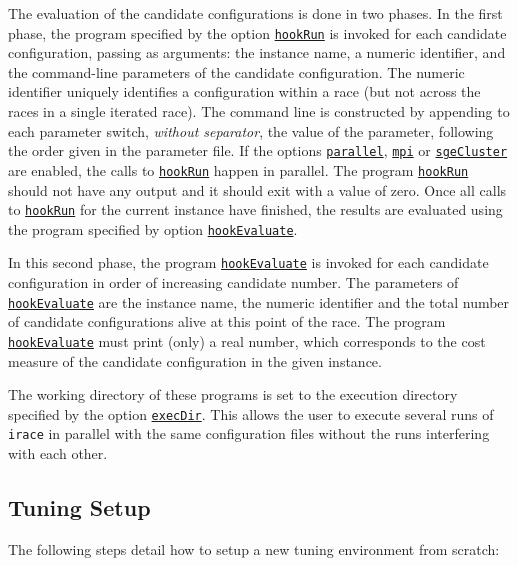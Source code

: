 \documentclass[a4paper]{article}
\newcommand{\irace}{\texttt{irace}\xspace}
\newcommand{\parameter}[1]{\hyperlink{opt:#1}{\texttt{#1}}}
\begin{document}
The evaluation of the candidate configurations is done in two
phases. In the first phase, the program specified by the
option \parameter{hookRun} is invoked for each candidate
configuration, passing as arguments: the instance name, a numeric
identifier, and the command-line parameters of the candidate
configuration. The numeric identifier uniquely identifies a
configuration within a race (but not across the races in a single
iterated race). The command line is constructed by appending to each
parameter switch, \emph{without separator}, the value of the
parameter, following the order given in the parameter file. If the
options \parameter{parallel}, \parameter{mpi}
or \parameter{sgeCluster} are enabled, the calls
to \parameter{hookRun} happen in parallel. The
program \parameter{hookRun} should not have any output and it should
exit with a value of zero.  Once all calls to \parameter{hookRun} for
the current instance have finished, the results are evaluated using
the program specified by option \parameter{hookEvaluate}.

In this second phase, the program 
\parameter{hookEvaluate} is invoked for each candidate configuration
in order of increasing candidate number. The parameters
of \parameter{hookEvaluate} are the instance name, the numeric
identifier and the total number of candidate configurations alive at
this point of the race. The program \parameter{hookEvaluate} must
print (only) a real number, which corresponds to the cost measure of
the candidate configuration in the given instance.

The working directory of these programs is set to the execution
directory specified by the option \parameter{execDir}. This allows the
user to execute several runs of \irace in parallel with the same
configuration files without the runs interfering with each other.


\subsection{Tuning Setup}\label{sec:tuning_setup}

The following steps detail how to setup a new tuning environment from scratch:
\end{document}
